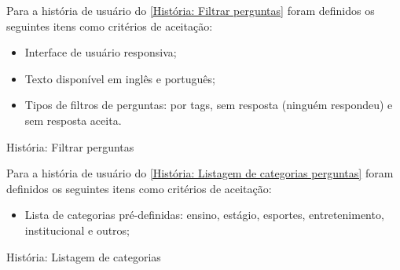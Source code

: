 Para a história de usuário do \autoref{História: Filtrar perguntas} foram definidos os seguintes itens como critérios de aceitação:

\begin{itemize}
\item Interface de usuário responsiva;
\item Texto disponível em inglês e português;
\item Tipos de filtros de perguntas: por tags, sem resposta (ninguém respondeu) e sem resposta aceita.
\end{itemize}

\def\arraystretch{2}
\begin{quadro}[htb]
\centering
\ABNTEXfontereduzida
\caption[História: Filtrar perguntas]{História: Filtrar perguntas}
\label{História: Filtrar perguntas}
\end{quadro}
\FloatBarrier 

Para a história de usuário do \autoref{História: Listagem de categorias perguntas} foram definidos os seguintes itens como critérios de aceitação:

\begin{itemize}
\item Lista de categorias pré-definidas: ensino, estágio, esportes, entretenimento, institucional e outros;  
\end{itemize}

\def\arraystretch{2}
\begin{quadro}[htb]
\centering
\ABNTEXfontereduzida
\caption[História: Listagem de categorias]{História: Listagem de categorias}
\label{História: Listagem de categorias perguntas}
\end{quadro}
\FloatBarrier 

